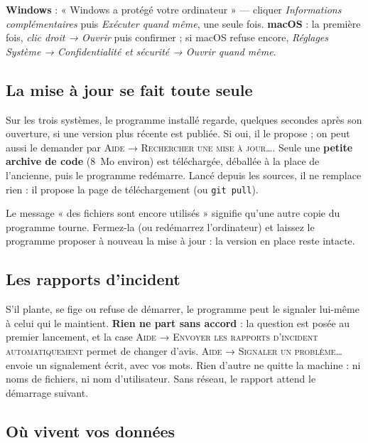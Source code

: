 \documentclass[a4paper,11pt]{article}
\begin{document}
\begin{attention}
\textbf{Windows} : « Windows a protégé votre ordinateur » — cliquer
\emph{Informations complémentaires} puis \emph{Exécuter quand même}, une seule
fois. \textbf{macOS} : la première fois, \emph{clic droit → Ouvrir} puis
confirmer ; si macOS refuse encore, \emph{Réglages Système → Confidentialité
et sécurité → Ouvrir quand même}.
\end{attention}

\subsection{La mise à jour se fait toute seule}

Sur les trois systèmes, le programme installé regarde, quelques secondes après
son ouverture, si une version plus récente est publiée. Si oui, il le propose ;
on peut aussi le demander par \textsc{Aide → Rechercher une mise à jour…}. Seule
une \textbf{petite archive de code} (8~Mo environ) est téléchargée, déballée à
la place de l'ancienne, puis le programme redémarre. Lancé depuis les sources,
il ne remplace rien : il propose la page de téléchargement (ou
\texttt{git pull}).

\begin{info}
Le message « des fichiers sont encore utilisés » signifie qu'une autre copie
du programme tourne. Fermez-la (ou redémarrez l'ordinateur) et laissez le
programme proposer à nouveau la mise à jour : la version en place reste
intacte.
\end{info}

\subsection{Les rapports d'incident}

S'il plante, se fige ou refuse de démarrer, le programme peut le signaler
lui-même à celui qui le maintient. \textbf{Rien ne part sans accord} : la
question est posée au premier lancement, et la case \textsc{Aide → Envoyer les
rapports d'incident automatiquement} permet de changer d'avis.
\textsc{Aide → Signaler un problème…} envoie un signalement écrit, avec vos
mots. Rien d'autre ne quitte la machine : ni noms de fichiers, ni nom
d'utilisateur. Sans réseau, le rapport attend le démarrage suivant.

\subsection{Où vivent vos données}
\end{document}
